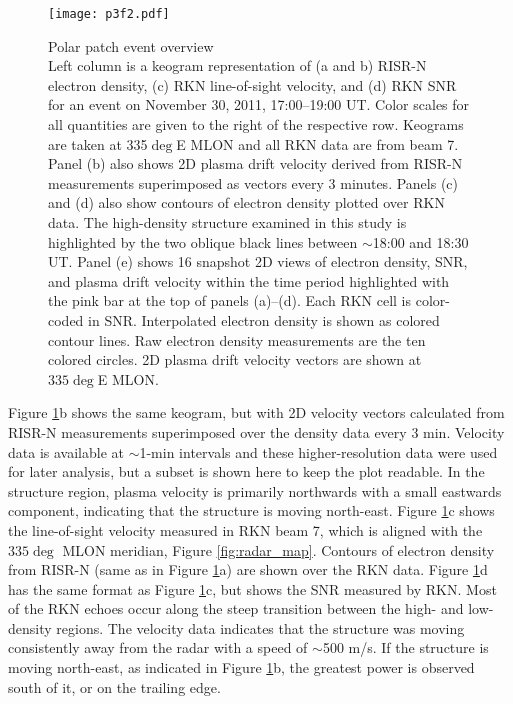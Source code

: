 \begin{figure}
	\texttt{[image: p3f2.pdf]}
  \caption[Polar patch event overview]{{\:}Polar patch event overview\\ Left column is a keogram representation of (a and b) RISR-N electron density, (c) RKN line-of-sight velocity, and (d) RKN SNR for an event on November 30, 2011, 17:00--19:00 UT.  Color scales for all quantities are given to the right of the respective row. Keograms are taken at 335\(\deg\)E MLON and all RKN data are from beam 7.  Panel (b) also shows 2D plasma drift velocity derived from RISR-N measurements superimposed as vectors every 3 minutes.  Panels (c) and (d) also show contours of electron density plotted over RKN data. The high-density structure examined in this study is highlighted by the two oblique black lines between \(\sim\)18:00 and 18:30 UT. Panel (e) shows 16 snapshot 2D views of electron density, SNR, and plasma drift velocity within the time period highlighted with the pink bar at the top of panels (a)--(d).  Each RKN cell is color-coded in SNR. Interpolated electron density is shown as colored contour lines. Raw electron density measurements are the ten colored circles.  2D plasma drift velocity vectors are shown at \(335\deg\)E MLON.}
  \label{fig:event_overview}
\end{figure}

Figure \ref{fig:event_overview}b shows the same keogram, but with 2D velocity vectors calculated from RISR-N measurements superimposed over the density data every 3 min.  Velocity data is available at \(\sim\)1-min intervals and these higher-resolution data were used for later analysis, but a subset is shown here to keep the plot readable. In the structure region, plasma velocity is primarily northwards with a small eastwards component, indicating that the structure is moving north-east.  Figure \ref{fig:event_overview}c shows the line-of-sight velocity measured in RKN beam 7, which is aligned with the \(335\deg\) MLON meridian, Figure \ref{fig:radar_map}. Contours of electron density from RISR-N (same as in Figure \ref{fig:event_overview}a) are shown over the RKN data. Figure \ref{fig:event_overview}d has the same format as Figure \ref{fig:event_overview}c, but shows the SNR measured by RKN. Most of the RKN echoes occur along the steep transition between the high- and low-density regions.  The velocity data indicates that the structure was moving consistently away from the radar with a speed of \(\sim\)500 m/s.  If the structure is moving north-east, as indicated in Figure \ref{fig:event_overview}b, the greatest power is observed south of it, or on the trailing edge.

